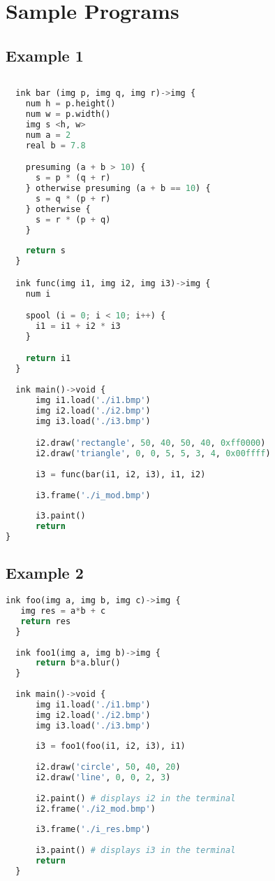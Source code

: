 \documentclass[a4paper, 11pt]{article}
\begin{document}



\section{Sample Programs}

\subsection*{Example 1}

\begin{lstlisting}[language=Python]
  
  ink bar (img p, img q, img r)->img {
    num h = p.height()
    num w = p.width()
    img s <h, w>
    num a = 2
    real b = 7.8

    presuming (a + b > 10) {
      s = p * (q + r)
    } otherwise presuming (a + b == 10) {
      s = q * (p + r)
    } otherwise {
      s = r * (p + q)
    }
      
    return s
  }

  ink func(img i1, img i2, img i3)->img {
    num i

    spool (i = 0; i < 10; i++) {
      i1 = i1 + i2 * i3
    }

    return i1
  }
  
  ink main()->void {
      img i1.load('./i1.bmp')
      img i2.load('./i2.bmp')
      img i3.load('./i3.bmp')

      i2.draw('rectangle', 50, 40, 50, 40, 0xff0000)
      i2.draw('triangle', 0, 0, 5, 5, 3, 4, 0x00ffff)
  
      i3 = func(bar(i1, i2, i3), i1, i2)
  
      i3.frame('./i_mod.bmp')
  
      i3.paint()
      return
}
\end{lstlisting}


\subsection*{Example 2}


\begin{lstlisting}[language=Python]
  ink foo(img a, img b, img c)->img { 
   img res = a*b + c 
   return res
  }
  
  ink foo1(img a, img b)->img {
      return b*a.blur()
  }
  
  ink main()->void {
      img i1.load('./i1.bmp')
      img i2.load('./i2.bmp')
      img i3.load('./i3.bmp')
  
      i3 = foo1(foo(i1, i2, i3), i1)
  
      i2.draw('circle', 50, 40, 20)
      i2.draw('line', 0, 0, 2, 3)
  
      i2.paint() # displays i2 in the terminal
      i2.frame('./i2_mod.bmp')
  
      i3.frame('./i_res.bmp')
  
      i3.paint() # displays i3 in the terminal
      return
  }
\end{lstlisting}

\end{document}
